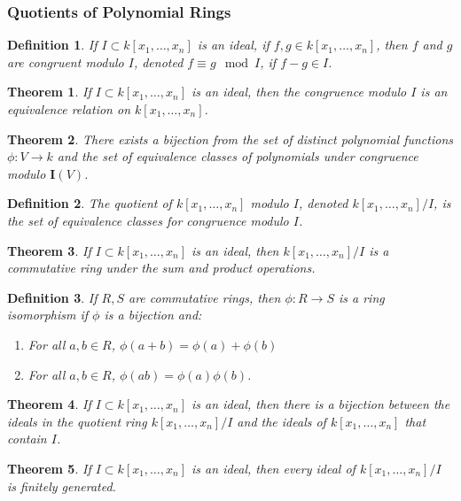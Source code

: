 \documentclass[oneside]{book}
\theoremstyle{mystyle}
\newtheorem{theorem}{Theorem}[section]
\newtheorem{definition}{Definition}[section]
\begin{document}
\subsubsection{Quotients of Polynomial Rings}
\begin{definition}
If $I\subset k[x_1,\hdots ,x_n]$ is an ideal, if $f,g\in k[x_1,\hdots ,x_n]$, then $f$ and $g$ are congruent modulo $I$, denoted $f \equiv g \mod I$, if $f-g \in I$.
\end{definition}
\begin{theorem}
If $I\subset k[x_1,\hdots ,x_n]$ is an ideal, then the congruence modulo $I$ is an equivalence relation on $k[x_1,\hdots ,x_n]$.
\end{theorem}
\begin{theorem}
There exists a bijection from the set of distinct polynomial functions $\phi:V\rightarrow k$ and the set of equivalence classes of polynomials under congruence modulo $\textbf{I}(V)$.
\end{theorem}
\begin{definition}
The quotient of $k[x_1,\hdots ,x_n]$ modulo $I$, denoted $k[x_1,\hdots ,x_n]/I$, is the set of equivalence classes for congruence modulo $I$.
\end{definition}
\begin{theorem}
If $I\subset k[x_1,\hdots ,x_n]$ is an ideal, then $k[x_1,\hdots ,x_n]/I$ is a commutative ring under the sum and product operations.
\end{theorem}
\begin{definition}
If $R,S$ are commutative rings, then $\phi:R\rightarrow S$ is a ring isomorphism if $\phi$ is a bijection and:
\begin{enumerate}
    \item For all $a,b\in R$, $\phi(a+b) = \phi(a)+\phi(b)$
    \item For all $a,b\in R$, $\phi(ab) = \phi(a)\phi(b)$.
\end{enumerate}
\end{definition}
\begin{theorem}
If $I\subset k[x_1,\hdots ,x_n]$ is an ideal, then there is a bijection between the ideals in the quotient ring $k[x_1,\hdots ,x_n]/I$ and the ideals of $k[x_1,\hdots ,x_n]$ that contain $I$.
\end{theorem}
\begin{theorem}
If $I\subset k[x_1,\hdots ,x_n]$ is an ideal, then every ideal of $k[x_1,\hdots ,x_n]/I$ is finitely generated.
\end{theorem}
\end{document}
